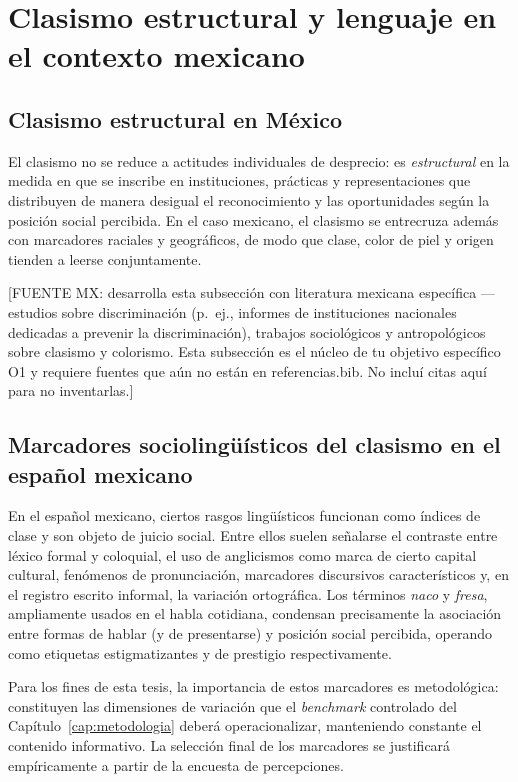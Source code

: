 \section{Clasismo estructural y lenguaje en el contexto mexicano}
\label{sec:clasismo}

\subsection{Clasismo estructural en México}
\label{sec:clasismo-mx}

El clasismo no se reduce a actitudes individuales de desprecio: es
\emph{estructural} en la medida en que se inscribe en instituciones, prácticas y
representaciones que distribuyen de manera desigual el reconocimiento y las
oportunidades según la posición social percibida. En el caso mexicano, el
clasismo se entrecruza además con marcadores raciales y geográficos, de modo que
clase, color de piel y origen tienden a leerse conjuntamente.

[FUENTE MX: desarrolla esta subsección con literatura mexicana específica
---estudios sobre discriminación (p.\ ej., informes de instituciones nacionales
dedicadas a prevenir la discriminación), trabajos sociológicos y antropológicos
sobre clasismo y colorismo. Esta subsección es el núcleo de tu objetivo
específico O1 y requiere fuentes que aún no están en referencias.bib. No incluí
citas aquí para no inventarlas.]

\subsection{Marcadores sociolingüísticos del clasismo en el español mexicano}
\label{sec:marcadores-mx}

En el español mexicano, ciertos rasgos lingüísticos funcionan como índices de
clase y son objeto de juicio social. Entre ellos suelen señalarse el contraste
entre léxico formal y coloquial, el uso de anglicismos como marca de cierto
capital cultural, fenómenos de pronunciación, marcadores discursivos
característicos y, en el registro escrito informal, la variación ortográfica.
Los términos \emph{naco} y \emph{fresa}, ampliamente usados en el habla
cotidiana, condensan precisamente la asociación entre formas de hablar (y de
presentarse) y posición social percibida, operando como etiquetas
estigmatizantes y de prestigio respectivamente.

Para los fines de esta tesis, la importancia de estos marcadores es metodológica:
constituyen las dimensiones de variación que el \emph{benchmark} controlado del
Capítulo~\ref{cap:metodologia} deberá operacionalizar, manteniendo constante el
contenido informativo. La selección final de los marcadores se justificará
empíricamente a partir de la encuesta de percepciones.

